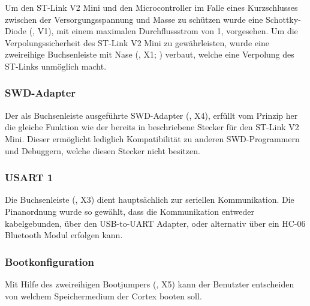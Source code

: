 Um den ST-Link V2 Mini und den Microcontroller im Falle eines Kurzschlusses zwischen der Versorgungsspannung und Masse zu schützen wurde eine Schottky-Diode (, V1), mit einem maximalen Durchflussstrom von \unit{1}{\ampere}, vorgesehen. Um die Verpolungssicherheit des ST-Link V2 Mini zu gewährleisten, wurde eine zweireihige Buchsenleiste mit Nase (, X1; ) verbaut, welche eine Verpolung des ST-Links unmöglich macht.


\subsubsection{SWD-Adapter}
Der als Buchsenleiste ausgeführte SWD-Adapter (, X4), erfüllt vom Prinzip her die gleiche Funktion wie der bereits in  beschriebene Stecker für den ST-Link V2 Mini. Dieser ermöglicht lediglich Kompatibilität zu anderen SWD-Programmern und Debuggern, welche diesen Stecker nicht besitzen.


\subsubsection{USART 1}
Die Buchsenleiste (, X3) dient hauptsächlich zur seriellen Kommunikation. Die Pinanordnung wurde so gewählt, dass die Kommunikation entweder kabelgebunden, über den \gls{USB-to-UART} Adapter, oder alternativ über ein HC-06 Bluetooth Modul erfolgen kann.


\subsubsection{Bootkonfiguration}
Mit Hilfe des zweireihigen Bootjumpers (, X5) kann der Benutzter entscheiden von welchem Speichermedium der Cortex booten soll.


